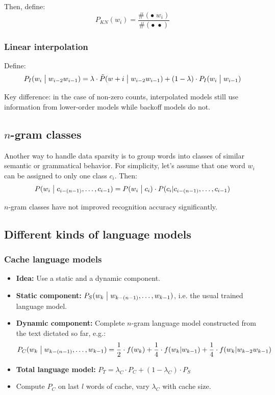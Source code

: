 \documentclass[11pt]{article}
\begin{document}
Then, define:
\[
    P_{KN}(w_i) = \frac{\#(\bullet \; w_i)}{\#(\bullet \; \bullet)}
\]

\subsubsection{Linear interpolation}

Define:
\[
    P_I(w_i \bigm| w_{i-2}w_{i-1}) = \lambda \cdot \tilde{P}(w+i \bigm| w_{i-2}w_{i-1}) + (1 - \lambda) \cdot P_I(w_{i} \bigm| w_{i-1})
\]

Key difference: in the case of non-zero counts, interpolated models still use information from lower-order models while backoff models do not.

\subsection{$n$-gram classes}

Another way to handle data sparsity is to group words into classes of similar semantic or grammatical behavior. For simplicity, let's assume that one word $w_i$ can be assigned to only one class $c_i$. Then:
\[
    P(w_i \bigm| c_{i-(n-1)}, \ldots, c_{i-1}) = P(w_i \bigm| c_i) \cdot P(c_i | c_{i-(n-1)}, \ldots, c_{i-1})
\]

$n$-gram classes have not improved recognition accuracy significantly.

\subsection{Different kinds of language models}

\subsubsection{Cache language models}
\begin{itemize}
    \item \textbf{Idea:} Use a static and a dynamic component.
    \item \textbf{Static component:} $P_S(w_k \bigm| w_{k-(n-1)}, \ldots, w_{k-1})$, i.e. the usual trained language model.
    \item \textbf{Dynamic component:} Complete $n$-gram language model constructed from the text dictated so far, e.g.:
        \[
            P_C(w_k \bigm| w_{k-(n-1)}, \ldots, w_{k-1}) = \frac{1}{2} \cdot f(w_k) + \frac{1}{4} \cdot f(w_k | w_{k-1}) + \frac{1}{4} \cdot f(w_k | w_{k-2} w_{k-1})
        \]
    \item \textbf{Total language model:} $P_T = \lambda_C \cdot P_C + (1 - \lambda_C) \cdot P_S$
    \item Compute $P_C$ on last $l$ words of cache, vary $\lambda_C$ with cache size.
\end{itemize}
\end{document}
